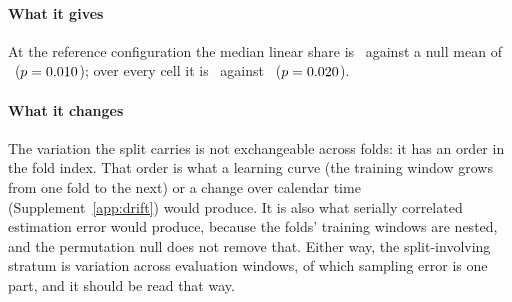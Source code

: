 \paragraph{What it gives}
At the reference configuration the median linear share is
\foldTrendRefMedian\ against a null mean of \foldTrendNullRef\
($p = 0.010$); over every cell it is \foldTrendAllMedian\ against
\foldTrendNullAll\ ($p = 0.020$).

\paragraph{What it changes}
The variation the split carries is not exchangeable across folds: it has an
order in the fold index. That order is what a learning curve (the training
window grows from one fold to the next) or a change over calendar time
(Supplement~\ref{app:drift}) would produce. It is also what serially
correlated estimation error would produce, because the folds' training
windows are nested, and the permutation null does not remove that. Either
way, the split-involving stratum is variation across evaluation windows, of
which sampling error is one part, and it should be read that way.
